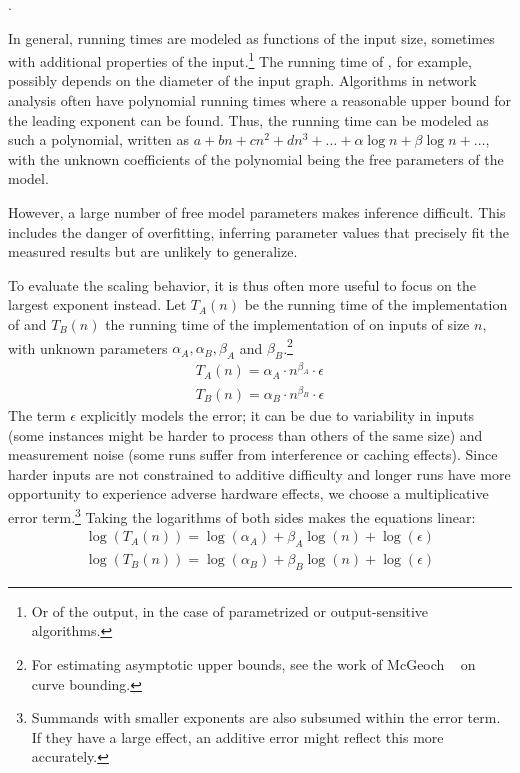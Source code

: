 \documentclass[algorithms,article,submit,moreauthors,pdftex]{Definitions/mdpi}
\newcommand{\changed}[1]{#1}
\newcommand{\removed}[1]{}
\begin{document}
\removed{A companion Jupyter notebook including this example and the following inferences is included in
the supplementary materials}.
%

In general, running times are modeled as functions of the input size, sometimes with additional properties of the input.\footnote{\changed{Or of the output, \eg in the case of parametrized or output-sensitive algorithms.}}
The running time of \kad, for example, possibly depends on the diameter of the input graph.
Algorithms in network analysis often have polynomial running times where a reasonable upper bound for the leading exponent can be found.
Thus, the running time can be modeled as such a polynomial, written as $a + bn + cn^2 + dn^3 + \ldots + \alpha \log n + \beta \log n + \ldots $, with the unknown coefficients of the polynomial being the free parameters of the model.

However, a large number of free model parameters makes inference difficult.
This includes the danger of overfitting, \ie inferring parameter values that precisely fit the measured results but are unlikely to generalize.

To evaluate the scaling behavior, it is thus often more useful to focus on the largest exponent instead.
Let $T_A(n)$ be the running time of the implementation of \rk and $T_B(n)$ the running time of the implementation of \kad on inputs of size $n$,
with unknown parameters $\alpha_A, \alpha_B, \beta_A$ and $\beta_B$.\footnote{For estimating asymptotic upper bounds, see the work of McGeoch \etal~\cite{McGeochP00} on curve bounding.}
%
\begin{align*}
 T_A(n) = \alpha_A \cdot n^{\beta_A} \cdot \epsilon\\
 T_B(n) = \alpha_B \cdot n^{\beta_B} \cdot \epsilon
\end{align*}
%
The term $\epsilon$ explicitly models the error; it can be due to variability in inputs (some instances might be harder to process than others of the same size) and measurement noise (some runs suffer from interference or caching effects).
Since harder inputs are not constrained to additive difficulty and longer runs have more opportunity to experience adverse hardware effects,
we choose a multiplicative error term.\footnote{Summands with smaller exponents are also subsumed within the error term. If they have a large effect, an additive error might reflect this more accurately.}
%
Taking the logarithms of both sides makes the equations linear:
\begin{align}
 \log(T_A(n)) = \log(\alpha_A) + \beta_A \log(n) + \log(\epsilon)\label{eq:log-transformed-a} \\
 \log(T_B(n)) = \log(\alpha_B) + \beta_B \log(n) + \log(\epsilon)\label{eq:log-transformed-b}
\end{align}
\end{document}
